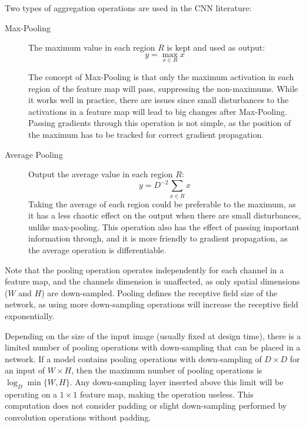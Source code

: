 Two types of aggregation operations are used in the CNN literature:

\begin{description}
    \item[Max-Pooling] The maximum value in each region $R$ is kept and used as output:
        \vspace*{1em}
        \begin{equation}
            y = \max_{x \in R} x 
        \end{equation}
        
        The concept of Max-Pooling is that only the maximum activation in each region of the feature map will pass, suppressing the non-maximums. While it works well in practice, there are issues since small disturbances to the activations in a feature map will lead to big changes after Max-Pooling. Passing gradients through this operation is not simple, as the position of the maximum has to be tracked for correct gradient propagation.
    \item[Average Pooling] Output the average value in each region $R$:
        \vspace*{1em}
        \begin{equation}
            y = D^{-2} \sum_{x \in R} x
        \end{equation}
        Taking the average of each region could be preferable to the maximum, as it has a less chaotic effect on the output when there are small disturbances, unlike max-pooling. This operation also has the effect of passing important information through, and it is more friendly to gradient propagation, as the average operation is differentiable.
\end{description}

Note that the pooling operation operates independently for each channel in a feature map, and the channels dimension is unaffected, as only spatial dimensions ($W$ and $H$) are down-sampled. Pooling defines the receptive field size of the network, as using more down-sampling operations will increase the receptive field exponentially.

Depending on the size of the input image (usually fixed at design time), there is a limited number of pooling operations with down-sampling that can be placed in a network. If a model contains pooling operations with down-sampling of $D \times D$ for an input of $W \times H$, then the maximum number of pooling operations is $\log_D \min \{ W, H\}$. Any down-sampling layer inserted above this limit will be operating on a $1 \times 1$ feature map, making the operation useless. This computation does not consider padding or slight down-sampling performed by convolution operations without padding.

